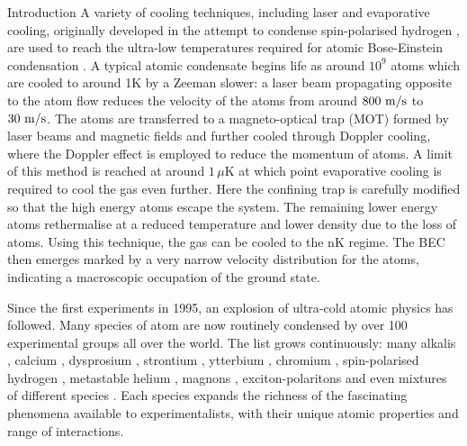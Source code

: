 \begin{chapter}{\label{cha:bose_gases}Introduction}
A variety of cooling techniques, including laser \cite{billphillips,chu98,Cohen-Tannoudji} and evaporative \cite{PhysRevB.34.3476} cooling, originally developed in the attempt to condense spin-polarised hydrogen \cite{Hecht59, PhysRevLett.44.164, Silvera86}, are used to reach the ultra-low temperatures required for atomic Bose-Einstein condensation \cite{Pethick,RevModPhys.74.1131,RevModPhys.74.875}. A typical atomic condensate begins life as around $10^9$ atoms which are cooled to around 1K by a Zeeman slower: a laser beam propagating opposite to the atom flow reduces the velocity of the atoms from around $800~\rm{m/s}$ to $30~\rm{m/s}$. The atoms are transferred to a magneto-optical trap (MOT) formed by laser beams and magnetic fields and further cooled through Doppler cooling, where the Doppler effect is employed to reduce the momentum of atoms. A limit of this method is reached at around $1\,\mu$K \cite{Pethick} at which point evaporative cooling is required to cool the gas even further. Here the confining trap is carefully modified so that the high energy atoms escape the system. The remaining lower energy atoms rethermalise at a reduced temperature and lower density due to the loss of atoms. Using this technique, the gas can be cooled to the nK regime. The BEC then emerges marked by a very narrow velocity distribution for the atoms, indicating a macroscopic occupation of the ground state. 

Since the first experiments in 1995, an explosion of ultra-cold atomic physics has followed. Many species of atom are now routinely condensed by over 100 experimental groups all over the world. The list grows continuously: many alkalis \cite{Anderson198,PhysRevLett.75.3969,PhysRevLett.75.1687,PhysRevLett.78.985,PhysRevLett.85.1795,Modugno,Robert461,Weber232}, calcium \cite{PhysRevLett.103.130401}, dysprosium \cite{PhysRevLett.107.190401}, strontium \cite{PhysRevLett.103.200401,PhysRevLett.103.200402, PhysRevA.82.041602, PhysRevA.81.051601}, ytterbium \cite{PhysRevLett.91.040404}, chromium \cite{PhysRevLett.94.160401}, spin-polarised hydrogen \cite{PhysRevLett.81.3811}, metastable helium \cite{PhysRevLett.86.3459}, magnons \cite{Mathew11}, exciton-polaritons \cite{Kasprzak06} and even mixtures of different species \cite{PhysRevLett.89.053202, PhysRevLett.89.190404, PhysRevLett.100.210402,PhysRevA.84.011603}. Each species expands the richness of the fascinating phenomena available to experimentalists, with their unique atomic properties and range of interactions.


\end{chapter}
